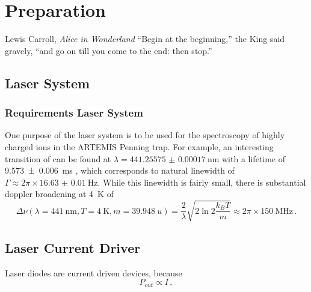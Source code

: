 \chapter{Preparation}
\begin{chapquote}{Lewis Carroll, \textit{Alice in Wonderland}}
``Begin at the beginning,'' the King said gravely, ``and go on till you come to the end: then stop.''
\end{chapquote}

\section{Laser System}
\subsection{Requirements Laser System}
One purpose of the laser system is to be used for the spectroscopy of highly charged ions in the ARTEMIS Penning trap. For example, an interesting transition of  can be found at $\lambda = \qty{441.25575(17)}{\nm}$ \cite{ar13+_wavelength} with a lifetime of \qty{9.573(6)}{\ms} \cite{ar13+_lifetime}, which corresponds to natural linewidth of $\Gamma \approx 2 \pi \times \qty{16.63(1)}{\Hz}$. While this linewidth is fairly small, there is substantial doppler broadening at \qty{4}{\K} of
\begin{equation}
    \Delta \nu (\lambda = \qty{441}{\nm}, T=\qty{4}{\K}, m=\qty{39.948}{u}) = \frac{2}{\lambda}\sqrt{2 \ln 2 \frac{k_B T}{m}} \approx 2 \pi \times \qty{150}{\MHz} \, . \label{eqn:doppler_broadening}
\end{equation}

\clearpage
\section{Laser Current Driver}%
\label{sec:laser_current_driver}
Laser diodes are current driven devices, because
\begin{equation*}
    P_{out} \propto I\,,
\end{equation*}

